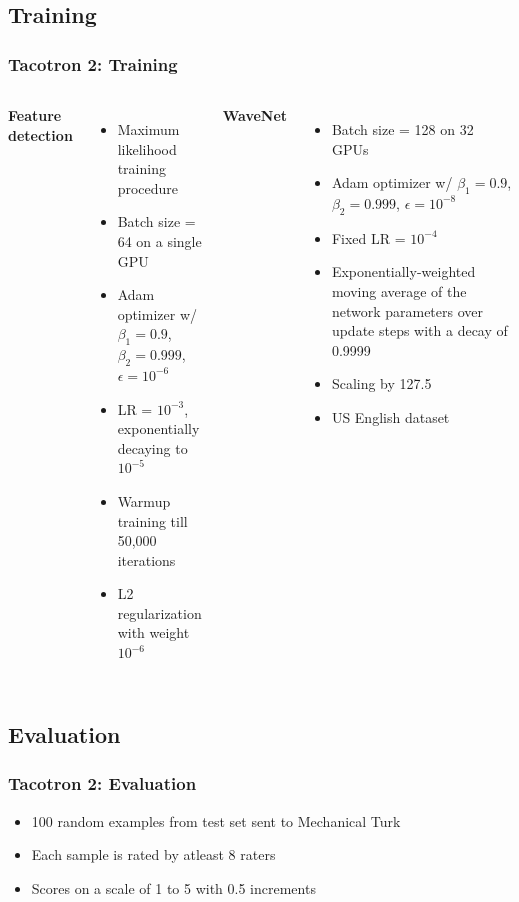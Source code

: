 \documentclass{beamer}
\begin{document}
  \subsection{Training}
  \begin{frame}
    \frametitle{Tacotron 2: Training}
    \begin{columns}
        \textbf{Feature detection}
        \begin{itemize}
          \item Maximum likelihood training procedure
          \item Batch size = 64 on a single GPU
          \item Adam optimizer w/ $\beta_1=0.9$, $\beta_2=0.999$, $\epsilon=10^{-6}$
          \item LR = $10^{-3}$, exponentially decaying to $10^{-5}$
          \item Warmup training till 50,000 iterations
          \item L2 regularization with weight $10^{-6}$
        \end{itemize}
        \textbf{WaveNet}
        \begin{itemize}
          \item Batch size = 128 on 32 GPUs
          \item Adam optimizer w/ $\beta_1=0.9$, $\beta_2=0.999$, $\epsilon=10^{-8}$
          \item Fixed LR = $10^{-4}$
          \item Exponentially-weighted moving average of the network parameters over update steps with a decay of 0.9999
          \item Scaling by 127.5
          \item US English dataset
        \end{itemize}
    \end{columns}
  \end{frame}

  \subsection{Evaluation}
  \begin{frame}
    \frametitle{Tacotron 2: Evaluation}
    \begin{itemize}
      \item 100 random examples from test set sent to Mechanical Turk
      \item Each sample is rated by atleast 8 raters
      \item Scores on a scale of 1 to 5 with 0.5 increments
    \end{itemize}
  \end{frame}
\end{document}
